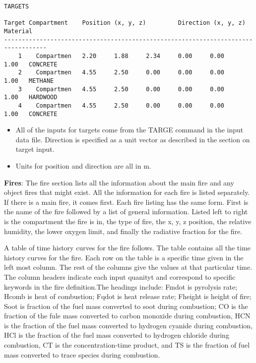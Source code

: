 \begin{lstlisting}[basicstyle=\tiny]
TARGETS

Target Compartment    Position (x, y, z)         Direction (x, y, z)      Material
----------------------------------------------------------------------------------
    1    Compartmen   2.20     1.88     2.34     0.00     0.00     1.00   CONCRETE
    2    Compartmen   4.55     2.50     0.00     0.00     0.00     1.00   METHANE
    3    Compartmen   4.55     2.50     0.00     0.00     0.00     1.00   HARDWOOD
    4    Compartmen   4.55     2.50     0.00     0.00     0.00     1.00   CONCRETE
\end{lstlisting}

\begin{itemize}
\item All of the inputs for targets come from the TARGE command in the input data file. Direction is specified as a unit vector as described in the section on target input.
\item Units for position and direction are all in m.
\end{itemize}

\textbf{Fires}: The fire section lists all the information about the main fire and any object fires that might exist.  All the information for each fire is listed separately.  If there is a main fire, it comes first.  Each fire listing has the same form.  First is the name of the fire followed by a list of general information.  Listed left to right is the compartment the fire is in, the type of fire, the x, y, z position, the relative humidity, the lower oxygen limit, and finally the radiative fraction for the fire.

A table of time history curves for the fire follows.  The table contains all the time history curves for the fire.  Each row on the table is a specific time given in the left most column.  The rest of the columns give the values at that particular time.  The column headers indicate each input quanityt and correspond to specific keywords in the fire definition.The headings include: Fmdot is pyrolysis rate; Hcomb is heat of combustion; Fqdot is heat release rate; Fheight is height of fire; Soot is fraction of the fuel mass converted to soot during combustion; CO is the fraction of the fule mass converted to carbon monoxide during combustion, HCN is the fraction of the fuel mass converted to hydrogen cyanide during combustion, HCl is the fraction of the fuel mass converted to hydrogen chloride during combustion, CT is the concentration-time product, and TS is the fraction of fuel mass converted to trace species during combustion.

